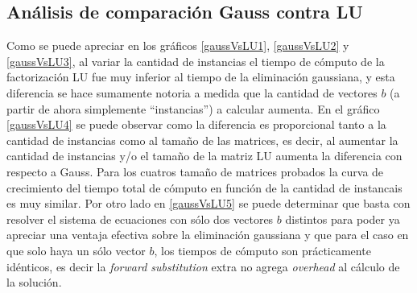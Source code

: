\subsection{Análisis de comparación Gauss contra LU}
Como se puede apreciar en los gráficos \ref{gaussVsLU1}, \ref{gaussVsLU2} y \ref{gaussVsLU3}, al
variar la cantidad de instancias el tiempo de cómputo de la factorización LU fue muy inferior al
tiempo de la eliminación gaussiana, y esta diferencia se hace sumamente notoria a medida que la
cantidad de vectores $b$ (a partir de ahora simplemente ``instancias'') a calcular aumenta. En el gráfico 
\ref{gaussVsLU4} se puede observar como la diferencia es proporcional tanto a la cantidad de instancias como al 
tamaño de las matrices, es decir, al aumentar la cantidad de instancias y/o el tamaño de la matriz LU aumenta 
la diferencia con respecto a Gauss. Para los cuatros tamaño de matrices probados la curva de crecimiento del tiempo total de cómputo en función de la cantidad de instancais es muy similar. Por otro lado en \ref{gaussVsLU5} se puede determinar que basta con resolver el 
sistema de ecuaciones con sólo dos vectores $b$ distintos para poder ya apreciar una ventaja efectiva sobre la eliminación gaussiana 
y que para el caso en que solo haya un sólo vector $b$, los tiempos de cómputo son prácticamente idénticos, es decir la 
\emph{forward substitution} extra no agrega \emph{overhead} al cálculo de la solución.
